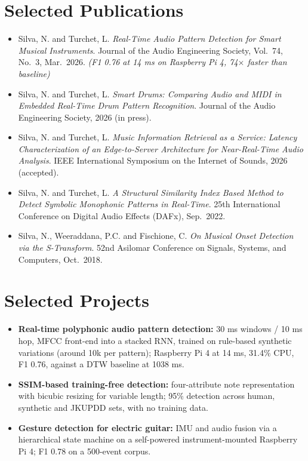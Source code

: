 \documentclass[11pt]{article}
\begin{document}
\section*{Selected Publications \footnotesize {}}
\begin{itemize}[leftmargin=1.2em, itemsep=-0.25em]
    \item Silva, N. and Turchet, L. \textit{Real-Time Audio Pattern Detection for Smart Musical Instruments}. Journal of the Audio Engineering Society, Vol.~74, No.~3, Mar.~2026. \textit{(F1 0.76 at 14 ms on Raspberry Pi 4, 74$\times$ faster than baseline)}
    \item Silva, N. and Turchet, L. \textit{Smart Drums: Comparing Audio and MIDI in Embedded Real-Time Drum Pattern Recognition}. Journal of the Audio Engineering Society, 2026 (in press).
    \item Silva, N. and Turchet, L. \textit{Music Information Retrieval as a Service: Latency Characterization of an Edge-to-Server Architecture for Near-Real-Time Audio Analysis}. IEEE International Symposium on the Internet of Sounds, 2026 (accepted).
    \item Silva, N. and Turchet, L. \textit{A Structural Similarity Index Based Method to Detect Symbolic Monophonic Patterns in Real-Time}. 25th International Conference on Digital Audio Effects (DAFx), Sep.~2022.
    \item Silva, N., Weeraddana, P.C. and Fischione, C. \textit{On Musical Onset Detection via the S-Transform}. 52nd Asilomar Conference on Signals, Systems, and Computers, Oct.~2018.
\end{itemize}

\section*{Selected Projects \footnotesize {}}
\begin{itemize}[leftmargin=1.2em, itemsep=-0.25em]
    \item \textbf{Real-time polyphonic audio pattern detection:} 30 ms windows / 10 ms hop, MFCC front-end into a stacked RNN, trained on rule-based synthetic variations (around 10k per pattern); Raspberry Pi 4 at 14 ms, 31.4\% CPU, F1 0.76, against a DTW baseline at 1038 ms.
    \item \textbf{SSIM-based training-free detection:} four-attribute note representation with bicubic resizing for variable length; 95\% detection across human, synthetic and JKUPDD sets, with no training data.
    \item \textbf{Gesture detection for electric guitar:} IMU and audio fusion via a hierarchical state machine on a self-powered instrument-mounted Raspberry Pi 4; F1 0.78 on a 500-event corpus.
\end{itemize}
\end{document}
